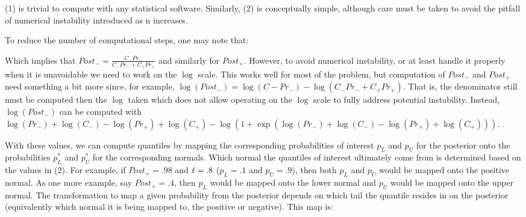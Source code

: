 (1) is trivial to compute with any statistical software. Similarly, (2) is conceptually simple, although care must be taken to avoid the pitfall of numerical instability introduced as n increases. 

To reduce the number of computational steps, one may note that:


Which implies that $Post_- = \frac{C_{-} Pr_{-}}{C_{-} Pr_{-} + C_{+} Pr_{+}}$ and similarly for $Post_+$. However, to avoid numerical instability, or at least handle it properly when it is unavoidable we need to work on the $\log$ scale. This works well for most of the problem, but computation of $Post_-$ and $Post_+$ need something a bit more since, for example, $\log(Post_-) = \log(C{-}Pr_{-}) - \log(C_{-} Pr_{-} + C_{+} Pr_{+})$. That is, the denominator still must be computed then the $\log$ taken which does not allow operating on the $\log$ scale to fully address potential instability. Instead, $\log(Post_-)$ can be computed with $\log(Pr_-) + \log(C_-) -  \log(Pr_+) + \log(C_+) - \log(1 + \exp(\log(Pr_-) + \log(C_-) -  \log(Pr_+) + \log(C_+)))$. .

With these values, we can compute quantiles by mapping the corresponding probabilities of interest $p_{L}$ and $p_{U}$ for the posterior onto the probabilities $p^*_{L}$ and $p^*_{U}$ for the corresponding normals. Which normal the quantiles of interest ultimately come from is determined based on the values in (2). For example, if $Post_{+} = .98$ and $\ell = .8$ ($p_{L} = .1$ and $p_{U} = .9$), then both $p_{L}$ and $p_{U}$ would be mapped onto the positive normal. As one more example, say $Post_{+} = .4$, then $p_{L}$ would be mapped onto the lower normal and $p_{U}$ would be mapped onto the upper normal. The transformation to map a given probability from the posterior depends on which tail the quantile resides in on the posterior (equivalently which normal it is being mapped to, the positive or negative). This map is:


